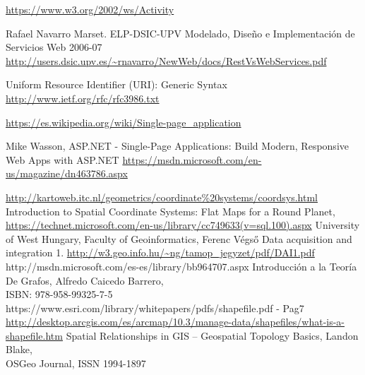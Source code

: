 \begin{thebibliography}{99}
 \url{https://www.w3.org/2002/ws/Activity}

 Rafael Navarro Marset. ELP-DSIC-UPV
Modelado, Diseño e Implementación de Servicios Web 2006-07 \url{http://users.dsic.upv.es/~rnavarro/NewWeb/docs/RestVsWebServices.pdf}

 Uniform Resource Identifier (URI): Generic Syntax \url{http://www.ietf.org/rfc/rfc3986.txt}

 \url{https://es.wikipedia.org/wiki/Single-page_application}

 Mike Wasson, ASP.NET - Single-Page Applications: Build Modern, Responsive Web Apps with ASP.NET  \url{https://msdn.microsoft.com/en-us/magazine/dn463786.aspx}


	 \url{http://kartoweb.itc.nl/geometrics/coordinate%20systems/coordsys.html}
	 Introduction to Spatial Coordinate Systems: Flat Maps for a Round Planet,\\ \url{https://technet.microsoft.com/en-us/library/cc749633(v=sql.100).aspx}
	 University of West Hungary, Faculty of Geoinformatics, Ferenc Végső
Data acquisition and integration 1. \url{http://w3.geo.info.hu/~ng/tamop_jegyzet/pdf/DAI1.pdf}
	 http://msdn.microsoft.com/es-es/library/bb964707.aspx
	 Introducción a la Teoría De Grafos, Alfredo Caicedo Barrero, \\ISBN: 978-958-99325-7-5
	 https://www.esri.com/library/whitepapers/pdfs/shapefile.pdf - Pag7
	 \url{http://desktop.arcgis.com/es/arcmap/10.3/manage-data/shapefiles/what-is-a-shapefile.htm}
	 Spatial Relationships in GIS – Geospatial Topology Basics, Landon Blake, \\OSGeo Journal, ISSN 1994-1897

\end{thebibliography}
